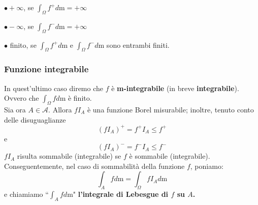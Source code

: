 \documentclass[a4paper,11pt]{article}
\theoremstyle{plain}
\theoremstyle{definition}
\theoremstyle{remark}
\begin{document}
$\bullet+\infty$, se $\displaystyle \int_{\Omega}f^{+}d\mathrm{m}=+\infty$

$\bullet-\infty$, se $\displaystyle \int_{\Omega}f^{-}d\mathrm{m}=+\infty$

$\bullet$ finito, se $\displaystyle \int_{\Omega}f^{+}d\mathrm{m}$  e $\displaystyle  \int_{\Omega}f^{-}d\mathrm{m}$ sono entrambi finiti.\\

\subsubsection{Funzione integrabile}
\noindent
In quest'ultimo caso diremo che $f$ è \textbf{m-integrabile} (in breve \textbf{integrabile}). Ovvero che  $\displaystyle 
\int_{\Omega}fd\mathrm{m}$ è finito.\\

\noindent
Sia ora $A\in \mathcal{A}$. Allora $fI_{A}$ è una funzione Borel misurabile; inoltre, tenuto conto delle disuguaglianze
$$
(fI_{A})^{+}=f^{+}I_{A}\leq f^{+} 
$$
e
$$
(fI_{A})^{-}=f^{-}I_{A}\leq f^{-}
$$
 $fI_{A}$ risulta sommabile (integrabile) se $f$ è sommabile (integrabile). Conseguentemente, nel caso di sommabilità della funzione $f$, poniamo:
$$
\int_{A}fd\mathrm{m}=\int_{\Omega}fI_{A}d\mathrm{m}
$$
e chiamiamo “${\displaystyle \int_{A}fd\text{m}}$" \textbf{l'integrale di Lebesgue di $f$ su $A$.}
\end{document}
